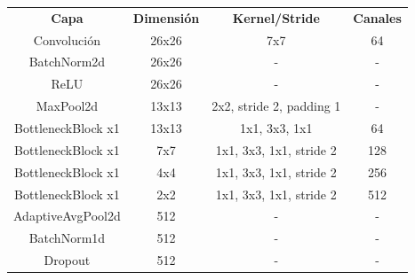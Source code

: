 \begin{table}[]
\begin{tabular}{|c|c|c|c|}
\hline
\multirow{2}{*}{\textbf{Capa}} & \multirow{2}{*}{\textbf{Dimensión}} & \multirow{2}{*}{\textbf{Kernel/Stride}} & \multirow{2}{*}{\textbf{Canales}} \\
                               &                                     &                                         &                                   \\ \hline
Convolución                    & 26x26                               & 7x7                                     & 64                                \\ \hline
BatchNorm2d                    & 26x26                               & -                                       & -                                 \\ \hline
ReLU                           & 26x26                               & -                                       & -                                 \\ \hline
MaxPool2d                      & 13x13                               & 2x2, stride 2, padding 1                & -                                 \\ \hline
BottleneckBlock x1             & 13x13                               & 1x1, 3x3, 1x1                           & 64                                \\ \hline
BottleneckBlock x1             & 7x7                                 & 1x1, 3x3, 1x1, stride 2                 & 128                               \\ \hline
BottleneckBlock x1             & 4x4                                 & 1x1, 3x3, 1x1, stride 2                 & 256                               \\ \hline
BottleneckBlock x1             & 2x2                                 & 1x1, 3x3, 1x1, stride 2                 & 512                               \\ \hline
AdaptiveAvgPool2d              & 512                                 & -                                       & -                                 \\ \hline
BatchNorm1d                    & 512                                 & -                                       & -                                 \\ \hline
Dropout                        & 512                                 & -                                       & -                                 \\ \hline

\end{tabular}
\end{table}
